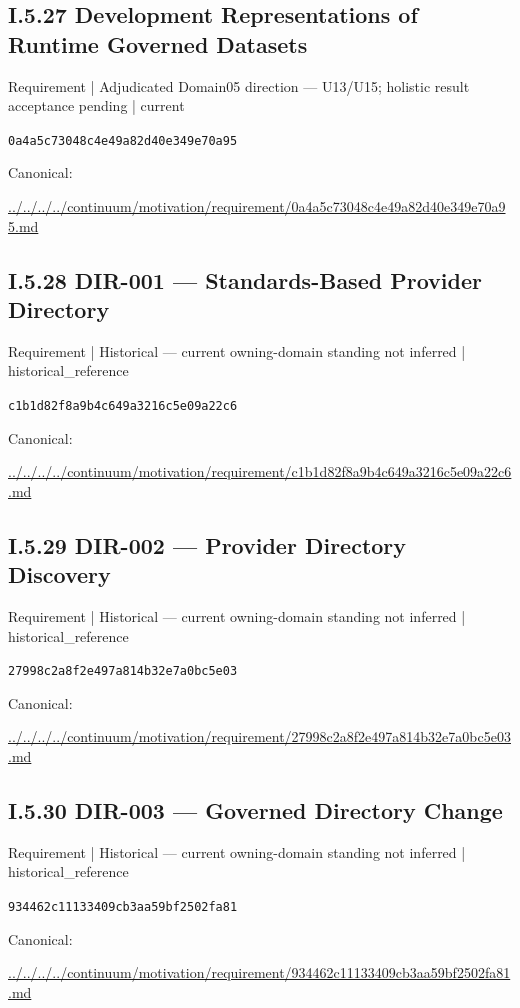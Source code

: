 \documentclass[10pt,a4paper]{article}
\begin{document}
\subsection*{I.5.27 Development Representations of Runtime Governed Datasets}
{\small Requirement | Adjudicated Domain05 direction — U13/U15; holistic result acceptance pending | current}\par
\texttt{0a4a5c73048c4e49a82d40e349e70a95}\par
Canonical: \par
{\footnotesize\url{../../../../continuum/motivation/requirement/0a4a5c73048c4e49a82d40e349e70a95.md}}\par
\subsection*{I.5.28 DIR-001 — Standards-Based Provider Directory}
{\small Requirement | Historical — current owning-domain standing not inferred | historical\_reference}\par
\texttt{c1b1d82f8a9b4c649a3216c5e09a22c6}\par
Canonical: \par
{\footnotesize\url{../../../../continuum/motivation/requirement/c1b1d82f8a9b4c649a3216c5e09a22c6.md}}\par
\subsection*{I.5.29 DIR-002 — Provider Directory Discovery}
{\small Requirement | Historical — current owning-domain standing not inferred | historical\_reference}\par
\texttt{27998c2a8f2e497a814b32e7a0bc5e03}\par
Canonical: \par
{\footnotesize\url{../../../../continuum/motivation/requirement/27998c2a8f2e497a814b32e7a0bc5e03.md}}\par
\subsection*{I.5.30 DIR-003 — Governed Directory Change}
{\small Requirement | Historical — current owning-domain standing not inferred | historical\_reference}\par
\texttt{934462c11133409cb3aa59bf2502fa81}\par
Canonical: \par
{\footnotesize\url{../../../../continuum/motivation/requirement/934462c11133409cb3aa59bf2502fa81.md}}\par
\end{document}
